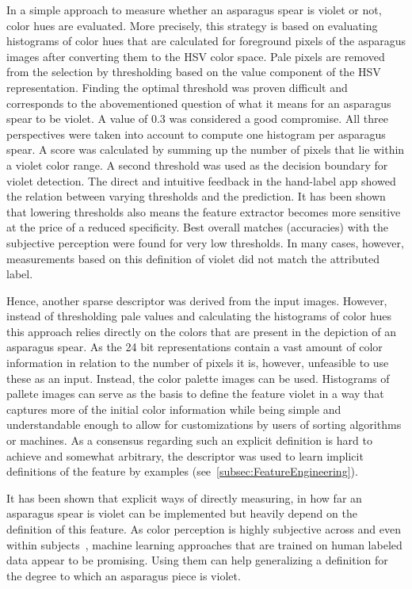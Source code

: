 \bigskip
In a simple approach to measure whether an asparagus spear is violet or not, color hues are evaluated. More precisely, this strategy is based on evaluating histograms of color hues that are calculated for foreground pixels of the asparagus images after converting them to the HSV color space. Pale pixels are removed from the selection by thresholding based on the value component of the HSV representation. Finding the optimal threshold was proven difficult and corresponds to the abovementioned question of what it means for an asparagus spear to be violet. A value of 0.3 was considered a good compromise. All three perspectives were taken into account to compute one histogram per asparagus spear. A score was calculated by summing up the number of pixels that lie within a violet color range. A second threshold was used as the decision boundary for violet detection. The direct and intuitive feedback in the hand-label app showed the relation between varying thresholds and the prediction. It has been shown that lowering thresholds also means the feature extractor becomes more sensitive at the price of a reduced specificity. Best overall matches (accuracies) with the subjective perception were found for very low thresholds. In many cases, however, measurements based on this definition of violet did not match the attributed label.

Hence, another sparse descriptor was derived from the input images. However, instead of thresholding pale values and calculating the histograms of color hues this approach relies directly on the colors that are present in the depiction of an asparagus spear. As the 24 bit representations contain a vast amount of color information in relation to the number of pixels it is, however, unfeasible to use these as an input. Instead, the color palette images can be used. Histograms of pallete images can serve as the basis to define the feature violet in a way that captures more of the initial color information while being simple and understandable enough to allow for customizations by users of sorting algorithms or machines. As a consensus regarding such an explicit definition is hard to achieve and somewhat arbitrary, the descriptor was used to learn implicit definitions of the feature by examples (see~\autoref{subsec:FeatureEngineering}).

\bigskip
It has been shown that explicit ways of directly measuring, in how far an asparagus spear is violet can be implemented but heavily depend on the definition of this feature. As color perception is highly subjective across and even within subjects~\citep{reeves1981metacontrast}, machine learning approaches that are trained on human labeled data appear to be promising. Using them can help generalizing a definition for the degree to which an asparagus piece is violet.


